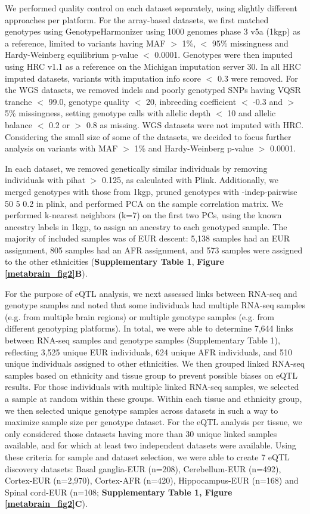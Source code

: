 We performed quality control on each dataset separately, using slightly different approaches per platform. For the array-based datasets, we first matched genotypes using GenotypeHarmonizer\cite{deelenGenotypeHarmonizerAutomatic2014} using 1000 genomes phase 3 v5a (1kgp) as a reference, limited to variants having MAF $>$ 1\%, $<$ 95\% missingness and Hardy-Weinberg equilibrium p-value $<$ 0.0001. Genotypes were then imputed using HRC v1.1 as a reference on the Michigan imputation server 30. In all HRC imputed datasets, variants with imputation info score $<$ 0.3 were removed. For the WGS datasets, we removed indels and poorly genotyped SNPs having VQSR tranche $<$ 99.0, genotype quality $<$ 20, inbreeding coefficient $<$ -0.3 and $>$ 5\% missingness, setting genotype calls with allelic depth $<$ 10 and allelic balance $<$ 0.2 or $>$ 0.8 as missing. WGS datasets were not imputed with HRC. Considering the small size of some of the datasets, we decided to focus further analysis on variants with MAF $>$ 1\% and Hardy-Weinberg p-value $>$ 0.0001. 

In each dataset, we removed genetically similar individuals by removing individuals with pihat $>$ 0.125, as calculated with Plink. Additionally, we merged genotypes with those from 1kgp, pruned genotypes with -indep-pairwise 50 5 0.2 in plink, and performed PCA on the sample correlation matrix. We performed k-nearest neighbors (k=7) on the first two PCs, using the known ancestry labels in 1kgp, to assign an ancestry to each genotyped sample. The majority of included samples was of EUR descent: 5,138 samples had an EUR assignment, 805 samples had an AFR assignment, and 573 samples were assigned to the other ethnicities (\textbf{Supplementary Table 1}, \textbf{Figure \ref{metabrain_fig2}B}). 

For the purpose of eQTL analysis, we next assessed links between RNA-seq and genotype samples and noted that some individuals had multiple RNA-seq samples (e.g. from multiple brain regions) or multiple genotype samples (e.g. from different genotyping platforms). In total, we were able to determine 7,644 links between RNA-seq samples and genotype samples (Supplementary Table 1), reflecting 3,525 unique EUR individuals, 624 unique AFR individuals, and 510 unique individuals assigned to other ethnicities. We then grouped linked RNA-seq samples based on ethnicity and tissue group to prevent possible biases on eQTL results. For those individuals with multiple linked RNA-seq samples, we selected a sample at random within these groups. Within each tissue and ethnicity group, we then selected unique genotype samples across datasets in such a way to maximize sample size per genotype dataset. For the eQTL analysis per tissue, we only considered those datasets having more than 30 unique linked samples available, and for which at least two independent datasets were available. Using these criteria for sample and dataset selection, we were able to create 7 eQTL discovery datasets: Basal ganglia-EUR (n=208), Cerebellum-EUR (n=492), Cortex-EUR (n=2,970), Cortex-AFR (n=420), Hippocampus-EUR (n=168) and Spinal cord-EUR (n=108; \textbf{Supplementary Table 1, Figure \ref{metabrain_fig2}C}). 


